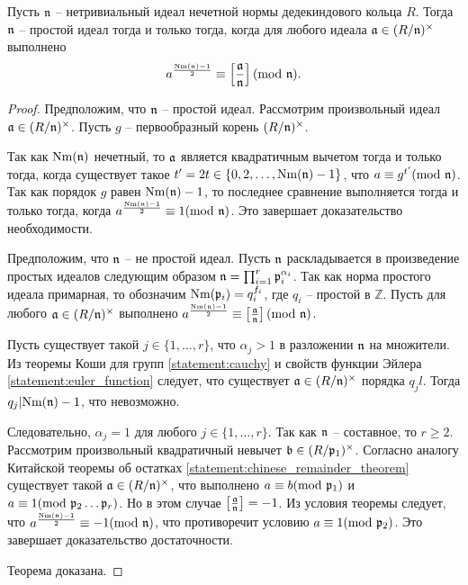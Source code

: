 \documentclass[_dissertation.tex]{subfiles}
\begin{document}
\begin{theorem}\label{theorem:euler_criteria}
    Пусть $\mathfrak{n}$ -- нетривиальный идеал нечетной нормы дедекиндового кольца $R$.
    Тогда $\mathfrak{n}$ -- простой идеал тогда и только тогда, когда для любого идеала $\mathfrak{a} \in (R/\mathfrak{n})^{\times}$ выполнено
    \begin{equation*}
        a^{\frac{\textrm{Nm}(\mathfrak{n}) - 1}{2}} \equiv \left[\frac{\mathfrak{a}}{\mathfrak{n}}\right](\textrm{mod } \mathfrak{n}).
    \end{equation*}
\end{theorem}
\begin{proof}
    Предположим, что $\mathfrak{n}$ -- простой идеал.
    Рассмотрим произвольный идеал $\mathfrak{a} \in (R/\mathfrak{n})^{\times}$.
    Пусть $g$ -- первообразный корень $(R/\mathfrak{n})^{\times}$.

    Так как $\textrm{Nm}(\mathfrak{n})$ нечетный, то $\mathfrak{a}$ является квадратичным вычетом тогда и только тогда, когда существует такое $t' = 2t \in \{0, 2, \dots, \textrm{Nm}(\mathfrak{n}) - 1\}$, что $a \equiv g^{t'} (\textrm{mod } \mathfrak{n})$.
    Так как порядок $g$ равен $\textrm{Nm}(\mathfrak{n}) - 1$, то последнее сравнение выполняется тогда и только тогда, когда $a^{\frac{\textrm{Nm}(\mathfrak{n}) - 1}{2}} \equiv 1(\textrm{mod } \mathfrak{n})$.
    Это завершает доказательство необходимости.

    Предположим, что $\mathfrak{n}$ -- не простой идеал.
    Пусть $\mathfrak{n}$ раскладывается в произведение простых идеалов следующим образом $\mathfrak{n} = \prod_{i=1}^{r} \mathfrak{p}_i^{\alpha_i}$.
    Так как норма простого идеала примарная, то обозначим $\textrm{Nm}(\mathfrak{p}_i) = q_i^{f_i}$, где $q_i$ -- простой в $\mathbb{Z}$.
    Пусть для любого $\mathfrak{a} \in (R/\mathfrak{n})^{\times}$ выполнено $a^{\frac{\textrm{Nm}(\mathfrak{n}) - 1}{2}} \equiv \left[\frac{\mathfrak{a}}{\mathfrak{n}}\right](\textrm{mod } \mathfrak{n})$.

    Пусть существует такой $j \in \{1, \dots, r\}$, что $\alpha_j > 1$ в разложении $\mathfrak{n}$ на множители.
    Из теоремы Коши для групп \ref{statement:cauchy} и свойств функции Эйлера \ref{statement:euler_function} следует, что существует $\mathfrak{a} \in (R/\mathfrak{n})^{\times}$ порядка $q_j l$.
    Тогда $q_j | \textrm{Nm}(\mathfrak{n}) - 1$, что невозможно.

    Следовательно, $\alpha_j = 1$ для любого $j \in \{1, \ldots, r\}$.
    Так как $\mathfrak{n}$ -- составное, то $r \ge 2$.
    Рассмотрим произвольный квадратичный невычет $\mathfrak{b} \in (R/\mathfrak{p}_1)^{\times}$.
    Согласно аналогу Китайской теоремы об остатках \ref{statement:chinese_remainder_theorem} существует такой $\mathfrak{a} \in (R/\mathfrak{n})^{\times}$, что выполнено $a \equiv b(\textrm{mod } \mathfrak{p}_1)$ и $a \equiv 1(\textrm{mod } \mathfrak{p}_2\dots\mathfrak{p}_r)$.
    Но в этом случае $\left[\frac{\mathfrak{a}}{\mathfrak{n}}\right] = -1$.
    Из условия теоремы следует, что $a^{\frac{\textrm{Nm}(\mathfrak{n}) - 1}{2}} \equiv -1(\textrm{mod } \mathfrak{n})$, что противоречит условию $a \equiv 1(\textrm{mod } \mathfrak{p}_2)$.
    Это завершает доказательство достаточности.

    Теорема доказана.
\end{proof}
\end{document}
